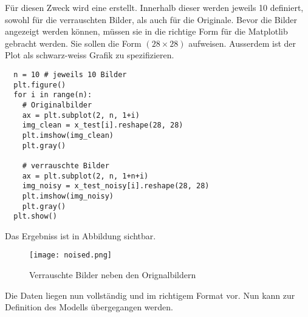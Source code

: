 \para{}
Für diesen Zweck wird eine  erstellt. Innerhalb dieser
werden jeweils 10  definiert, sowohl für die verrauschten Bilder, als
auch für die Originale.
Bevor die Bilder angezeigt werden können, müssen sie in die richtige Form für
die Matplotlib gebracht werden. Sie sollen die Form $(28 \times 28)$ aufweisen.
Ausserdem ist der Plot als schwarz-weiss Grafik zu spezifizieren.
\begin{verbatim}
  n = 10 # jeweils 10 Bilder
  plt.figure()
  for i in range(n):
    # Originalbilder
    ax = plt.subplot(2, n, 1+i)
    img_clean = x_test[i].reshape(28, 28)
    plt.imshow(img_clean)
    plt.gray()

    # verrauschte Bilder
    ax = plt.subplot(2, n, 1+n+i)
    img_noisy = x_test_noisy[i].reshape(28, 28)
    plt.imshow(img_noisy)
    plt.gray()
  plt.show()
\end{verbatim}

Das Ergebniss ist in Abbildung  sichtbar.
\begin{figure}[h!]
  \centering
  \texttt{[image: noised.png]}
  \caption{Verrauschte Bilder neben den Orignalbildern}
  \label{fig:noisy_clean_mnist}
\end{figure}
\para{}
Die Daten liegen nun vollständig und im richtigem Format vor.
Nun kann zur Definition des Modells übergegangen werden.


